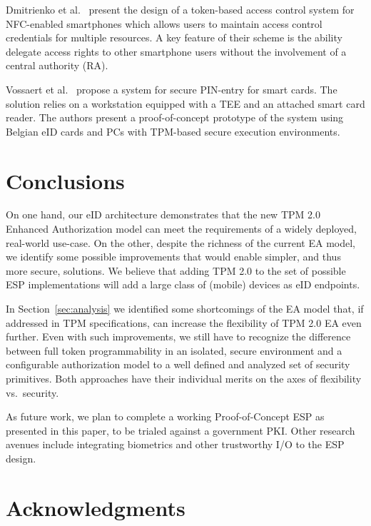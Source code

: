 \documentclass{sig-alternate-2013}
\begin{document}
Dmitrienko et al.~\cite{Dmitrienko12} present the design of a token-based access
control system for NFC-enabled smartphones which allows users to maintain access
control credentials for multiple resources. A key feature of their scheme is the
ability delegate access rights to other smartphone users without the involvement
of a central authority (RA).

Vossaert et al.~\cite{Vossaert14} propose a system for secure PIN-entry for
smart cards. The solution relies on a workstation equipped with a TEE and an
attached smart card reader. The authors present a proof-of-concept prototype of
the system using Belgian eID cards and PCs with TPM-based secure execution
environments. 


 
\section{Conclusions}
\label{sec:conclusion}

On one hand, our eID architecture demonstrates that the new TPM 2.0 Enhanced
Authorization model can meet the requirements of a widely deployed, real-world
use-case. On the other, despite the richness of the current EA model, we
identify some possible improvements that would enable simpler, and thus more
secure, solutions. We believe that adding TPM 2.0 to the set of possible ESP
implementations will add a large class of (mobile) devices as eID endpoints.
  
In Section~\ref{sec:analysis} we identified some shortcomings of the EA model
that, if addressed in TPM specifications, can increase the flexibility of TPM 2.0
EA even further. Even with such improvements, we still have to recognize the
difference between full token programmability in an isolated, secure environment
and a configurable authorization model to a well defined and analyzed set of
security primitives. Both approaches have their individual merits on the axes of
flexibility vs.\ security.

As future work, we plan to complete a working Proof-of-Concept ESP as presented
in this paper, to be trialed against a government PKI\@. Other research avenues
include integrating biometrics and other trustworthy I/O to the ESP design.

 
\section{Acknowledgments}
\label{sec:acknowledgements}
\end{document}
